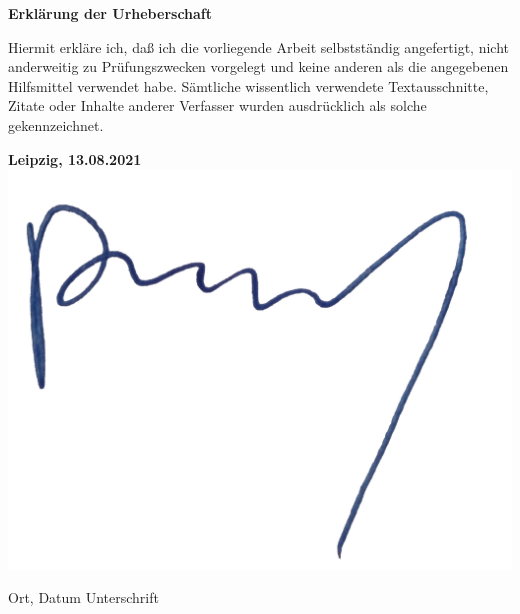 \documentclass[a4paper, monochrome]{article}
\begin{document}















\clearpage

%
%
%
\setcounter{biburllcpenalty}{7000}
\setcounter{biburlucpenalty}{8000}

\printbibliography[title=Literatur, keyword=literature]
\printbibliography[title=Software, keyword=software]
\printbibliography[title=Online, keyword=online]

\clearpage

\textbf{Erklärung der Urheberschaft}

\vspace{1cm}

Hiermit erkläre ich, daß ich die vorliegende Arbeit
selbstständig angefertigt, nicht anderweitig zu Prüfungszwecken vorgelegt und
keine anderen als die angegebenen Hilfsmittel verwendet habe. Sämtliche 
wissentlich verwendete Textausschnitte, Zitate oder Inhalte anderer Verfasser 
wurden ausdrücklich als solche gekennzeichnet.

\vfill

\hspace{2cm} \textbf{Leipzig, 13.08.2021} \hspace{2cm} \includegraphics[scale=0.3]{graphics/signature.png}


\vspace{1cm}

\hspace{2cm} Ort, Datum \hfill Unterschrift \hspace{2cm}
\end{document}
